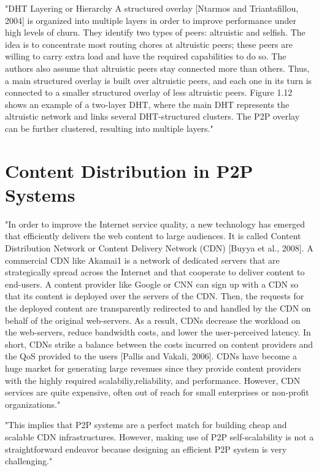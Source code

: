 "DHT Layering or Hierarchy
A structured overlay [Ntarmos and Triantafillou, 2004] is organized into multiple layers in order to improve performance under high levels of churn.
They identify two types of peers: altruistic and selfish.
The idea is to concentrate most routing chores at altruistic peers; these peers are willing to carry extra load and have the required capabilities to do so.
The authors also assume that altruistic peers stay connected more than others.
Thus, a main structured overlay is built over altruistic peers, and each one in its turn is connected to a smaller structured overlay of less altruistic peers.
Figure 1.12 shows an example of a two-layer DHT, where the main DHT represents the altruistic network and links several DHT-structured clusters.
The P2P overlay can be further clustered, resulting into multiple layers."\cite{book:p2p-mob}

\section{Content Distribution in P2P Systems}

"In order to improve the Internet service quality, a new technology has emerged that efficiently delivers the web content to large audiences. It is called Content Distribution Network or Content Delivery Network (CDN) [Buyya et al., 2008].
A commercial CDN like Akamai1 is a network of dedicated servers that are strategically spread across the Internet and that cooperate to deliver content to end-users.
A content provider like Google or CNN can sign up with a CDN so that its content is deployed over the servers of the CDN.
Then, the requests for the deployed content are transparently redirected to and handled by the CDN on behalf of the original web-servers.
As a result, CDNs decrease the workload on the web-servers, reduce bandwidth costs, and lower the user-perceived latency.
In short, CDNs strike a balance between the costs incurred on content providers and the QoS provided to the users [Pallis and Vakali, 2006].
CDNs have become a huge market for generating large revenues since they provide content providers with the highly required scalabiliy,reliability, and performance.
However, CDN services are quite expensive, often out of reach for small enterprises or non-profit organizations."\cite{book:p2p-mob}

"This implies that P2P systems are a perfect match for building cheap and scalable CDN infrastructures.
However, making use of P2P self-scalability is not a straightforward endeavor because designing an efficient P2P system is very challenging."\cite{book:p2p-mob}

